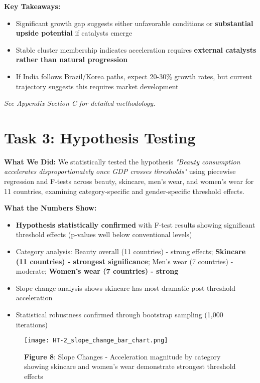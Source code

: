 \documentclass[11pt]{article}
\begin{document}
\textbf{Key Takeaways:}
\vspace{-3pt}
\begin{itemize}
    \setlength{\itemsep}{1pt}
    \item Significant growth gap suggests either unfavorable conditions or \textbf{substantial upside potential} if catalysts emerge
    \item Stable cluster membership indicates acceleration requires \textbf{external catalysts rather than natural progression}
    \item If India follows Brazil/Korea paths, expect 20-30\% growth rates, but current trajectory suggests this requires market development
\end{itemize}
\textit{See Appendix Section C for detailed methodology.}

\section{Task 3: Hypothesis Testing}

\textbf{What We Did:} We statistically tested the hypothesis \textit{"Beauty consumption accelerates disproportionately once GDP crosses thresholds"} using piecewise regression and F-tests across beauty, skincare, men's wear, and women's wear for 11 countries, examining category-specific and gender-specific threshold effects.

\textbf{What the Numbers Show:}
\vspace{-3pt}
\begin{itemize}
    \setlength{\itemsep}{1pt}
    \item \textbf{Hypothesis statistically confirmed} with F-test results showing significant threshold effects (p-values well below conventional levels)
    \item Category analysis: Beauty overall (11 countries) - strong effects; \textbf{Skincare (11 countries) - strongest significance}; Men's wear (7 countries) - moderate; \textbf{Women's wear (7 countries) - strong}
    \item Slope change analysis shows skincare has most dramatic post-threshold acceleration
    \item Statistical robustness confirmed through bootstrap sampling (1,000 iterations)
\end{itemize}

\begin{figure}[H]
\centering
\texttt{[image: HT-2\_slope\_change\_bar\_chart.png]}
\caption{\textbf{Figure 8}: Slope Changes - Acceleration magnitude by category showing skincare and women's wear demonstrate strongest threshold effects}
\end{figure}
\end{document}
